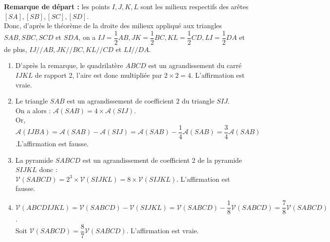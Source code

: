 \begin{corrige}
   {\bf Remarque de départ :} les points $I, J, K, L$ sont les milieux respectifs des arêtes $[SA], [SB], [SC], [SD]$. \\
   Donc, d'après le théorème de la droite des milieux appliqué aux triangles $SAB, SBC, SCD$ et $SDA$, on a $IJ =\dfrac12 AB, JK =\dfrac12 BC, KL =\dfrac12 CD, LI =\dfrac12DA$ et de plus, $IJ // AB, JK // BC, KL // CD$ et $LI // DA$. \\ [1mm]
   \begin{enumerate}
      \item D'après la remarque, le quadrilatère $ABCD$ est un  agrandissement du carré $IJKL$ de rapport 2, l'aire est donc multipliée par $2\times2 =4$. {\blue L'affirmation est vraie}.
      \item Le triangle $SAB$ est un agrandissement de coefficient $2$ du triangle $SIJ$. \\
         On a alors : $\mathcal{A}(SAB) =4\times \mathcal{A}(SIJ)$. \\
         Or, $\mathcal{A}(IJBA) =\mathcal{A}(SAB)-\mathcal{A}(SIJ) =\mathcal{A}(SAB)-\dfrac14\mathcal{A}(SAB) =\dfrac34\mathcal{A}(SAB)$.{\blue L'affirmation est fausse}.
      \item La pyramide $SABCD$ est un agrandissement de coefficient $2$ de la pyramide $SIJKL$ donc : \\
         $\mathcal{V}(SABCD) =2^3\times \mathcal{V}(SIJKL) =8\times\mathcal{V}(SIJKL)$. {\blue L'affirmation est fausse}.
      \item $\mathcal{V}(ABCDIJKL) =\mathcal{V}(SABCD)-\mathcal{V}(SIJKL) =\mathcal{V}(SABCD)-\dfrac18\mathcal{V}(SABCD) =\dfrac78\mathcal{V}(SABCD)$. \\
         Soit $\mathcal{V}(SABCD) =\dfrac87\mathcal{V}(SABCD)$. {\blue L'affirmation est vraie}.
   \end{enumerate}
\end{corrige}

\bigskip


